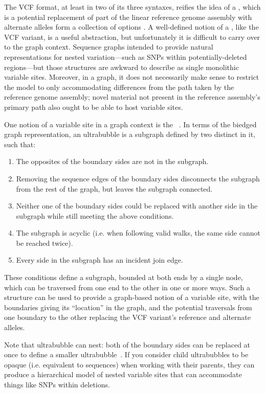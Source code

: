 The VCF format, at least in two of its three syntaxes, reifies the idea of a , which is a potential replacement of part of the linear reference genome assembly with alternate alleles form a collection of options \cite{marshall2013variant}. A well-defined notion of a , like the VCF variant, is a useful abstraction, but unfortunately it is difficult to carry over to the graph context. Sequence graphs intended to provide natural representations for nested variation---such as SNPs within potentially-deleted regions---but those structures are awkward to describe as single monolithic variable sites. Moreover, in a graph, it does not necessarily make sense to restrict the model to only accommodating differences from the path taken by the reference genome assembly; novel material not present in the reference assembly's primary path also ought to be able to host variable sites.

One notion of a variable site in a graph context is the ~\cite{paten2017superbubbles}. In terms of the biedged graph representation, an ultrabubble is a subgraph defined by two distinct  in it, such that:
\begin{enumerate}
    \item The opposites of the boundary sides are not in the subgraph.
    \item Removing the sequence edges of the boundary sides disconnects the subgraph from the rest of the graph, but leaves the subgraph connected.
    \item Neither one of the boundary sides could be replaced with another side in the subgraph while still meeting the above conditions.
    \item The subgraph is acyclic (i.e. when following valid walks, the same side cannot be reached twice).
    \item Every side in the subgraph has an incident join edge.
\end{enumerate}

These conditions define a subgraph, bounded at both ends by a single node, which can be traversed from one end to the other in one or more ways. Such a structure can be used to provide a graph-based notion of a variable site, with the boundaries giving its ``location'' in the graph, and the potential traversals from one boundary to the other replacing the VCF variant's reference and alternate alleles.

Note that ultrabubble can nest: both of the boundary sides can be replaced at once to define a smaller  ultrabubble~\cite{paten2017superbubbles}. If you consider child ultrabubbles to be opaque (i.e. equivalent to sequences) when working with their parents, they can produce a hierarchical model of nested variable sites that can accommodate things like SNPs within deletions.

